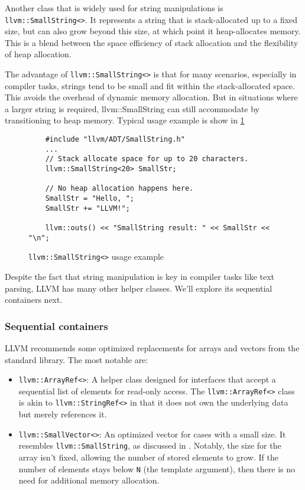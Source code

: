 Another class that is widely used for string manipulations is
\texttt{llvm::SmallString<>}. It represents a string that is
stack-allocated up to a fixed size, but can also grow beyond this size, at which
point it heap-allocates memory. This is a blend between the space efficiency of
stack allocation and the flexibility of heap allocation.

The advantage of \texttt{llvm::SmallString<>} is that for many scenarios,
especially in compiler tasks, strings tend to be small and fit within the
stack-allocated space. This avoids the overhead of dynamic memory
allocation. But in situations where a larger string is required,
llvm::SmallString can still accommodate by transitioning to heap memory. Typical
usage example is show in \cref{lis:ch4:smallstring_usage}
\begin{figure}[H]
  \begin{verbatim}
    #include "llvm/ADT/SmallString.h"
    ...
    // Stack allocate space for up to 20 characters.
    llvm::SmallString<20> SmallStr;
    
    // No heap allocation happens here.
    SmallStr = "Hello, ";
    SmallStr += "LLVM!";

    llvm::outs() << "SmallString result: " << SmallStr << "\n";
  \end{verbatim}
\caption{\texttt{llvm::SmallString<>} usage example}
\label{lis:ch4:smallstring_usage}
\end{figure}

Despite the fact that string manipulation is key in compiler tasks like text
parsing, LLVM has many other helper classes. We'll explore its sequential
containers next. 

\subsubsection{Sequential containers}
LLVM recommends some optimized replacements for arrays and vectors from the
standard library. The most notable are: 
\begin{itemize}
  \item \texttt{llvm::ArrayRef<>}: A helper class designed for
    interfaces that accept a sequential list of elements for read-only
    access. The \texttt{llvm::ArrayRef<>} class is akin to
    \texttt{llvm::StringRef<>} in that it does not own the underlying
    data but merely references it. 
  \item \texttt{llvm::SmallVector<>}: An optimized vector for cases
    with a small size. It resembles \texttt{llvm::SmallString}, as
    discussed in . Notably, the size for the
    array isn't fixed, allowing the number of stored elements to grow. If the
    number of elements stays below \texttt{N} (the template argument),
    then there is no need for additional memory allocation. 
\end{itemize}

